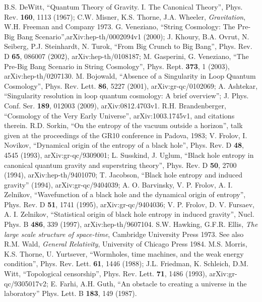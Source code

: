 \documentclass[12pt]{article}
\begin{document}
\begin{thebibliography}{99}

\small
{}
B.S. DeWitt, ``Quantum Theory of Gravity. I. The Canonical Theory'', Phys. Rev. \textbf{160}, 1113 (1967); 
C.W. Misner, K.S. Thorne, J.A. Wheeler, \textit{Gravitation}, W.H. Freeman and Company 1973.
G. Veneziano, ``String Cosmology: The Pre-Big Bang Scenario'',arXiv:hep-th/0002094v1 (2000); J. Khoury, B.A. Ovrut, N. Seiberg, P.J. Steinhardt, N. Turok, ``From Big Crunch to Big Bang'', Phys. Rev. D \textbf{65}, 086007 (2002), arXiv:hep-th/0108187; M. Gasperini, G. Veneziano, ``The Pre-Big Bang Scenario in String Cosmology'', Phys. Rept. \textbf{373}, 1 (2003), arXiv:hep-th/0207130.
M. Bojowald, ``Absence of a Singularity in Loop Quantum Cosmology'', Phys. Rev. Lett. \textbf{86}, 5227 (2001), arXiv:gr-qc/0102069; A. Ashtekar, ``Singularity resolution in loop quantum cosmology: A brief overview''; J. Phys. Conf. Ser. \textbf{189}, 012003 (2009), arXiv:0812.4703v1.
R.H. Brandenberger, ``Cosmology of the Very Early Universe'', arXiv:1003.1745v1, and citations therein.
R.D. Sorkin, ``On the entropy of the vacuum outside a horizon'', talk given at the proceedings of the GR10 conference in Padova, 1983; V. Frolov, I. Novikov, ``Dynamical origin of the entropy of a black hole'', Phys. Rev. D \textbf{48}, 4545 (1993), arXiv:gr-qc/9309001; L. Susskind, J. Uglum, ``Black hole entropy in canonical quantum gravity and superstring theory'', Phys. Rev. D \textbf{50}, 2700 (1994), arXiv:hep-th/9401070; T. Jacobson, ``Black hole entropy and induced gravity'' (1994), arXiv:gr-qc/9404039; A. O. Barvinsky, V. P. Frolov, A. I. Zelnikov, ``Wavefunction of a black hole and the dynamical origin of entropy'', Phys. Rev. D \textbf{51}, 1741 (1995), arXiv:gr-qc/9404036; V. P. Frolov, D. V. Fursaev, A. I. Zelnikov, ``Statistical origin of black hole entropy in induced gravity'', Nucl. Phys. B \textbf{486}, 339 (1997), arXiv:hep-th/9607104.
S.W. Hawking, G.F.R. Ellis, \textit{The large scale structure of space-time}, Cambridge University Press 1973.  See also R.M. Wald, \textit{General Relativity}, University of Chicago Press 1984.
M.S. Morris, K.S. Thorne, U. Yurtsever, ``Wormholes, time machines, and the weak energy condition'', Phys. Rev. Lett. \textbf{61}, 1446 (1988); J.L. Friedman, K. Schleich, D.M. Witt, ``Topological censorship'', Phys. Rev. Lett. \textbf{71}, 1486 (1993), arXiv:gr-qc/9305017v2; 
E. Farhi, A.H. Guth, ``An obstacle to creating a universe in the laboratory'' Phys. Lett. B \textbf{183}, 149 (1987).

\end{thebibliography}
\end{document}
